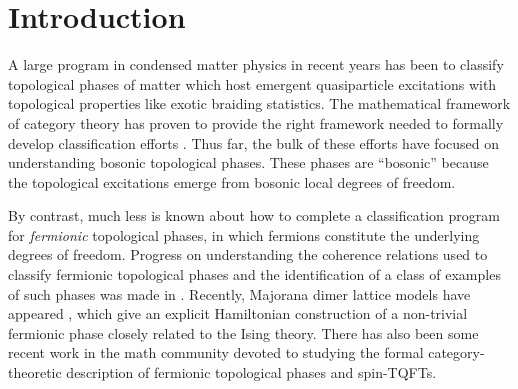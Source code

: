 
\section{Introduction}


A large program in condensed matter physics in recent years has been to classify 
topological phases of matter which host emergent quasiparticle excitations 
with topological properties like exotic braiding statistics. 
The mathematical framework of category theory has proven to provide the right 
framework needed to formally develop classification efforts \cite{kitaev2006}. 
Thus far, the bulk of these efforts have focused on understanding bosonic topological phases.
These phases are ``bosonic'' because the topological excitations emerge from bosonic 
local degrees of freedom.

By contrast, much less is known about how to complete a classification program for {\it fermionic} topological phases, in which fermions constitute 
the underlying degrees of freedom. 
Progress on understanding the coherence relations used to classify fermionic topological phases and the identification of a class of examples of such phases was made in \cite{gu2015,gu2014,Lan2016b}. 
Recently, Majorana dimer lattice models have appeared \cite{ware2016,tarantino2016}, 
which give an explicit Hamiltonian construction of a 
non-trivial
fermionic phase closely related to the Ising theory. 
There has also been some recent work in the math community \cite{usher2016,brundan2016,bruillard2017,bonderson2017} 
devoted to studying the formal category-theoretic description of fermionic topological phases and spin-TQFTs. 

